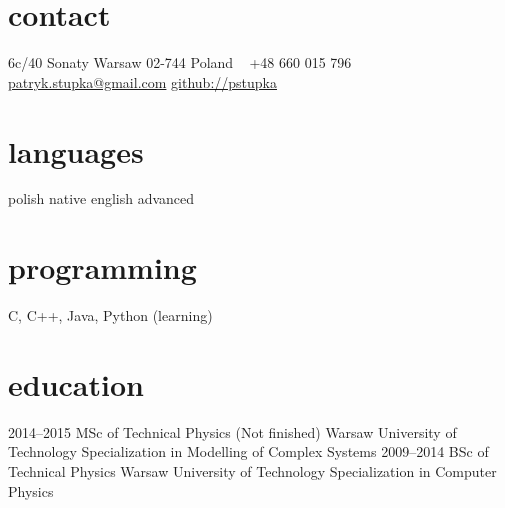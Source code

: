 \documentclass[]{friggeri-cv} %
\begin{document}


\begin{aside} %
\section{contact}
6c/40 Sonaty
Warsaw 02-744
Poland
~
+48 660 015 796
~
\href{mailto:patryk.stupka@gmail.com}{patryk.stupka@gmail.com}
\href{https://github.com/pstupka/}{github://pstupka}
\section{languages}
polish native
english advanced
\section{programming}
C, C++, Java,
Python (learning)
\end{aside}


\section{education}

\begin{entrylist}
\entry
	{2014--2015}
	{MSc {\normalfont of Technical Physics (Not finished)}}
	{Warsaw University of Technology}
	{Specialization in Modelling of Complex Systems}
\entry
	{2009--2014}
	{BSc {\normalfont of Technical Physics}}
	{Warsaw University of Technology}
	{Specialization in Computer Physics}
\end{entrylist}

\end{document}
